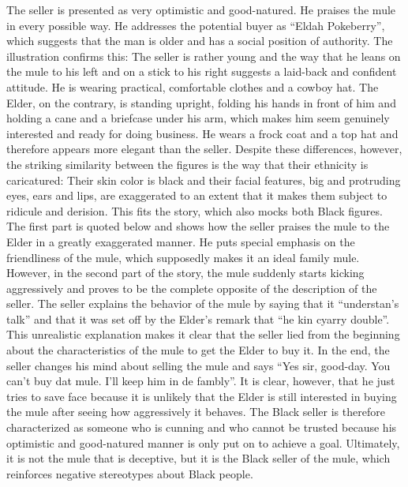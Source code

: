 The seller is presented as very optimistic and good-natured. He praises the mule in every possible way. He addresses the potential buyer as “Eldah Pokeberry”, which suggests that the man is older and has a social position of authority. The illustration confirms this: The seller is rather young and the way that he leans on the mule to his left and on a stick to his right suggests a laid-back and confident attitude. He is wearing practical, comfortable clothes and a cowboy hat. The Elder, on the contrary, is standing upright, folding his hands in front of him and holding a cane and a briefcase under his arm, which makes him seem genuinely interested and ready for doing business. He wears a frock coat and a top hat and therefore appears more elegant than the seller. Despite these differences, however, the striking similarity between the figures is the way that their ethnicity is caricatured: Their skin color is black and their facial features, big and protruding eyes, ears and lips, are exaggerated to an extent that it makes them subject to ridicule and derision. This fits the story, which also mocks both Black figures. The first part is quoted below and shows how the seller praises the mule to the Elder in a greatly exaggerated manner. He puts special emphasis on the friendliness of the mule, which supposedly makes it an ideal family mule. However, in the second part of the story, the mule suddenly starts kicking aggressively and proves to be the complete opposite of the description of the seller. The seller explains the behavior of the mule by saying that it “understan’s talk” and that it was set off by the Elder’s remark that “he kin cyarry double”. This unrealistic explanation makes it clear that the seller lied from the beginning about the characteristics of the mule to get the Elder to buy it. In the end, the seller changes his mind about selling the mule and says “Yes sir, good-day. You can’t buy dat mule. I’ll keep him in de fambly”. It is clear, however, that he just tries to save face because it is unlikely that the Elder is still interested in buying the mule after seeing how aggressively it behaves. The Black seller is therefore characterized as someone who is cunning and who cannot be trusted because his optimistic and good-natured manner is only put on to achieve a goal. Ultimately, it is not the mule that is deceptive, but it is the Black seller of the mule, which reinforces negative stereotypes about Black people.





